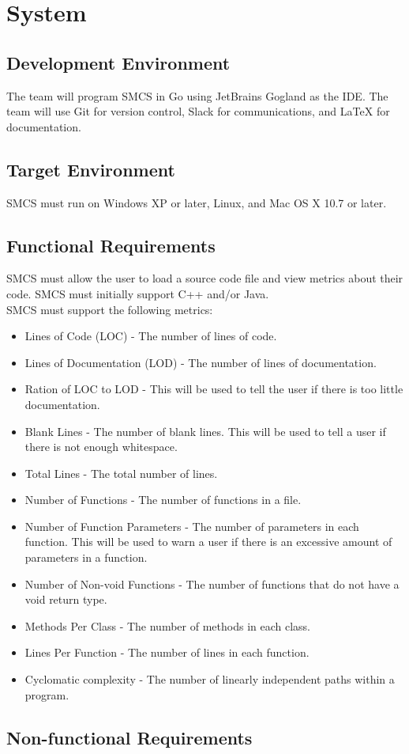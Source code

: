 \documentclass{scrreprt}
\begin{document}
	\chapter{System}
	\section{Development Environment}
	The team will program SMCS in Go using JetBrains Gogland as the IDE. The team will use Git for version control, Slack for communications, and LaTeX for documentation.
	\section{Target Environment}
	SMCS must run on Windows XP or later, Linux, and Mac OS X 10.7 or later.
	\section{Functional Requirements}
	SMCS must allow the user to load a source code file and view metrics about their code. SMCS must initially support C++ and/or Java.\\
	SMCS must support the following metrics:
	\begin{itemize}
		\item Lines of Code (LOC) - The number of lines of code.
		\item Lines of Documentation (LOD) - The number of lines of documentation.
		\item Ration of LOC to LOD - This will be used to tell the user if there is too little documentation.
		\item Blank Lines - The number of blank lines. This will be used to tell a user if there is not enough whitespace.
		\item Total Lines - The total number of lines.
		\item Number of Functions - The number of functions in a file.
		\item Number of Function Parameters - The number of parameters in each function. This will be used to warn a user if there is an excessive amount of parameters in a function.
		\item Number of Non-void Functions - The number of functions that do not have a void return type.
		\item Methods Per Class - The number of methods in each class.
		\item Lines Per Function - The number of lines in each function.
		\item Cyclomatic complexity - The number of linearly independent paths within a program.
	\end{itemize}
	\section{Non-functional Requirements}
\end{document}
